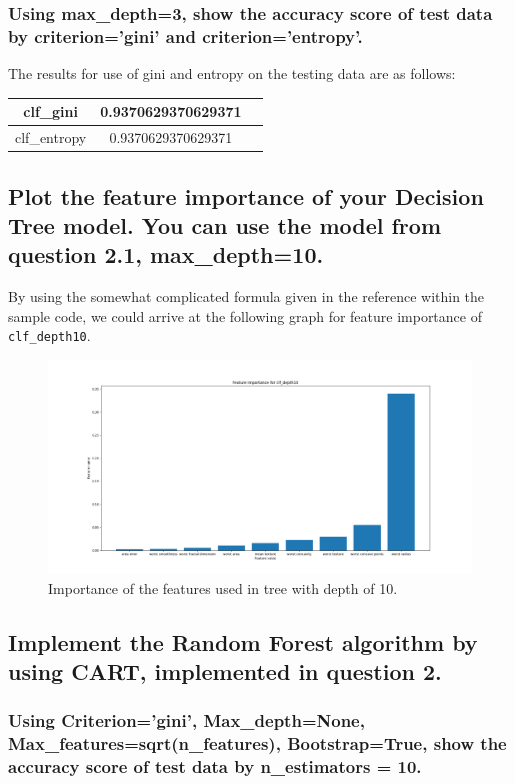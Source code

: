 \documentclass{article}
\begin{document}
		\subsubsection{Using max\_depth=3, show the accuracy score of test data by criterion='gini' 
						and criterion='entropy'.}
				The results for use of gini and entropy on the testing data are as follows:
				\begin{center}
						\begin{tabular}{|c |c |c |}
							\hline
							clf\_gini & 0.9370629370629371\\\hline	
							clf\_entropy & 0.9370629370629371\\\hline
						\end{tabular}
				\end{center}
		\subsection{Plot the feature importance of your Decision Tree model. You can use the model
			from question 2.1, max\_depth=10. }
			By using the somewhat complicated formula given in the reference within the sample code,
			we could arrive at the following graph for feature importance of \texttt{clf\_depth10}.

			\begin{center}
			\begin{figure}
				\includegraphics[scale=0.3]{Figure_1}
				\caption{Importance of the features used in tree with depth of 10.}
			\end{figure}
			\end{center}
		\subsection{Implement the Random Forest algorithm by using CART, implemented in question 2.}
			\subsubsection{Using Criterion='gini', Max\_depth=None, Max\_features=sqrt(n\_features), 
			Bootstrap=True, show the accuracy score of test data by n\_estimators = 10.}
\end{document}
